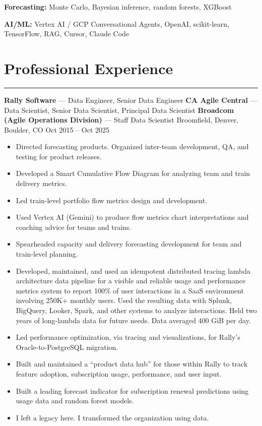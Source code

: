 \documentclass[letterpaper,10pt]{article}
\newcommand{\mblue}{\color{darkblue}}
\begin{document}
\vspace{1pc}
\textbf{Forecasting:} Monte Carlo, Bayesian inference, random forests, XGBoost

\vspace{1pc}
\textbf{AI/ML:} Vertex AI / GCP Conversational Agents, OpenAI, scikit-learn, TensorFlow, RAG, Cursor, Claude Code




\section*{\mblue Professional Experience}

\vspace{-2.15pc}
{\hfill\mblue\rule{4.615in}{0.02cm}}

\vspace{1pc}
\textbf{Rally Software} --- Data Engineer, Senior Data Engineer
\smallbreak\textbf{CA Agile Central} --- Data Scientist, Senior Data Scientist, Principal Data Scientist
\smallbreak\textbf{Broadcom (Agile Operations Division)} --- Staff Data Scientist
\smallbreak Broomfield, Denver, Boulder, CO \textbar{} Oct 2015 -- Oct 2025

\begin{itemize}
    \item Directed forecasting products. Organized inter-team development, QA, and testing for product releases.
    \item Developed a Smart Cumulative Flow Diagram for analyzing team and train delivery metrics.
    \item Led train-level portfolio flow metrics design and development.
    \item Used Vertex AI (Gemini) to produce flow metrics chart interpretations and coaching advice for teams and trains.
    \item Spearheaded capacity and delivery forecasting development for team and train-level planning.
    \item Developed, maintained, and used an idempotent distributed tracing lambda architecture data pipeline for a visible and reliable usage and performance metrics system to report 100\% of user interactions in a SaaS environment involving 250K+ monthly users. Used the resulting data with Splunk, BigQuery, Looker, Spark, and other systems to analyze interactions. Held two years of long-lambda data for future needs. Data averaged 400 GiB per day.
    \item Led performance optimization, via tracing and visualizations, for Rally's Oracle-to-PostgreSQL migration.
    \item Built and maintained a ``product data hub'' for those within Rally to track feature adoption, subscription usage, performance, and user input.
    \item Built a leading forecast indicator for subscription renewal predictions using usage data and random forest models.
    \item I left a legacy here. I transformed the organization using data.
\end{itemize}
\end{document}
